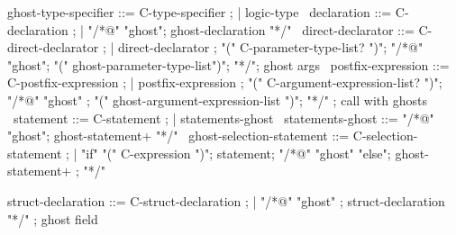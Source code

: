 \begin{syntax}

  ghost-type-specifier ::= C-type-specifier ;
  | {logic-type} \
  declaration ::= C-declaration ;
  | "/*@" "ghost";
     ghost-declaration "*/" \
  direct-declarator ::= C-direct-declarator ;
    | direct-declarator ;
    "(" C-parameter-type-list? ")";
        {"/*@" "ghost"};
          {"(" ghost-parameter-type-list")"};
          {"*/"}; ghost args
        \
  postfix-expression ::= C-postfix-expression ;
    | postfix-expression ;
     "(" C-argument-expression-list? ")";
     {"/*@" "ghost"} ;
     {  "(" ghost-argument-expression-list ")"};
     {  "*/"} ; call with ghosts
    \
  statement ::= C-statement ;
             | statements-ghost \
  statements-ghost ::= "/*@" "ghost";
                       ghost-statement+ "*/" \
  ghost-selection-statement ::= C-selection-statement ;
    | "if" "(" C-expression ")";
       statement;
      {"/*@" "ghost" "else"};
      {  ghost-statement+ };
      {  "*/"} \

  struct-declaration ::= C-struct-declaration ;
  | {"/*@" "ghost" };
    { struct-declaration "*/"} ; ghost field

\end{syntax}

